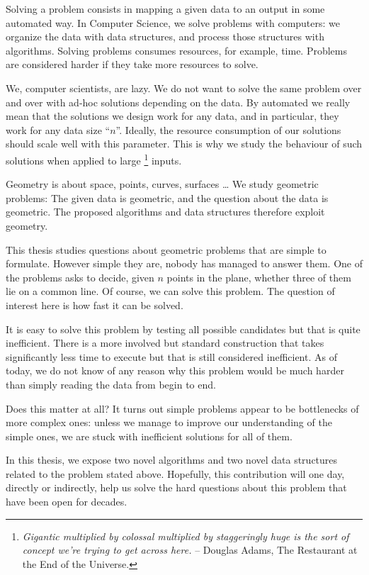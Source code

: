 

Solving a problem consists in mapping a given data to an output in some
automated way.
In Computer Science, we solve problems with computers: we organize the data
with data structures, and process those structures with algorithms.
%
Solving problems consumes resources, for example, time.
Problems are considered harder if they take more resources to solve.

We, computer scientists, are lazy. We do not want to solve the same problem
over and over with ad-hoc solutions depending on the data.
%
By automated we really mean that the solutions we
design work for any data, and in particular, they work for any data size
``\(n\)''.
%
Ideally, the resource consumption of our solutions should scale well with this
parameter.
%
This is why we study the behaviour of such solutions when applied to large%
\footnote{%
\emph{
	Gigantic multiplied by colossal multiplied by staggeringly
	huge is the sort of concept we're trying to get across here.
}
-- Douglas Adams, The Restaurant at the End of the Universe.
}
inputs.

Geometry is about space, points, curves, surfaces \dots
We study geometric problems:
%
The given data is geometric, and the question about the data is geometric.
The proposed algorithms and data structures therefore exploit geometry.

This thesis studies questions about geometric problems that are simple to
formulate. However simple they are, nobody
has managed to answer them. One of the problems asks to decide, given \(n\) points in the plane,
whether three of them lie on a common line. Of course, we can solve this
problem. The question of interest here is how fast it can be solved.

It is easy to solve this problem by testing all possible candidates but that is
quite inefficient. There is a
more involved but standard construction that takes significantly less time to
execute but that is still considered inefficient. As of today, we do not know of
any reason why this problem would be much harder than simply
reading the data from begin to end.

Does this matter at all? It turns out simple problems appear to
be bottlenecks of more complex ones: unless we manage to improve our
understanding of the simple ones, we are stuck with inefficient solutions for
all of them.

In this thesis, we expose two novel algorithms and two novel data
structures related to the problem stated above. Hopefully, this contribution
will one day, directly or indirectly, help us solve the hard questions about
this problem that have been open for decades.
